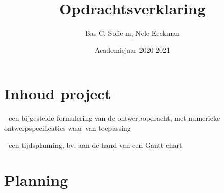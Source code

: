 \documentclass[a4paper,kul]{kulakarticle}
\date{Academiejaar 2020-2021}
\title{Opdrachtsverklaring}
\author{Bas C, Sofie m, Nele Eeckman}
\begin{document}
	\maketitle
	
	\section*{Inhoud project}
	- een bijgestelde formulering van de ontwerpopdracht, met numerieke ontwerpspecificaties waar van toepassing
	
	- een tijdsplanning, bv. aan de hand van een Gantt-chart
	
	\section*{Planning}
	
\end{document}
